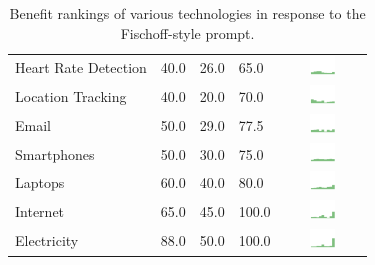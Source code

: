 \begin{table}[h]
\begin{center}
\begin{tabular}{| p{2.6cm} | p{.8cm} | p{.8cm} | p{.8cm} | c |}
Heart Rate Detection & 40.0 & 26.0 & 65.0 & \includegraphics[width = 2cm, height = 0.5cm]{tex-inputs/table-images/heartratedetectionben} \\ 
Location Tracking & 40.0 & 20.0 & 70.0 & \includegraphics[width = 2cm, height = 0.5cm]{tex-inputs/table-images/locationtrackingben} \\ 
Email & 50.0 & 29.0 & 77.5 & \includegraphics[width = 2cm, height = 0.5cm]{tex-inputs/table-images/emailben} \\ 
Smartphones & 50.0 & 30.0 & 75.0 & \includegraphics[width = 2cm, height = 0.5cm]{tex-inputs/table-images/smartphonesben} \\ 
Laptops & 60.0 & 40.0 & 80.0 & \includegraphics[width = 2cm, height = 0.5cm]{tex-inputs/table-images/laptopsben} \\ 
Internet & 65.0 & 45.0 & 100.0 & \includegraphics[width = 2cm, height = 0.5cm]{tex-inputs/table-images/internetben} \\ 
Electricity & 88.0 & 50.0 & 100.0 & \includegraphics[width = 2cm, height = 0.5cm]{tex-inputs/table-images/ElectricityBenefit} \\ 
\hline
\end{tabular}
\caption{Benefit rankings of various technologies in response to the Fischoff-style prompt. }
\label{benefit}
\end{center}
\end{table}